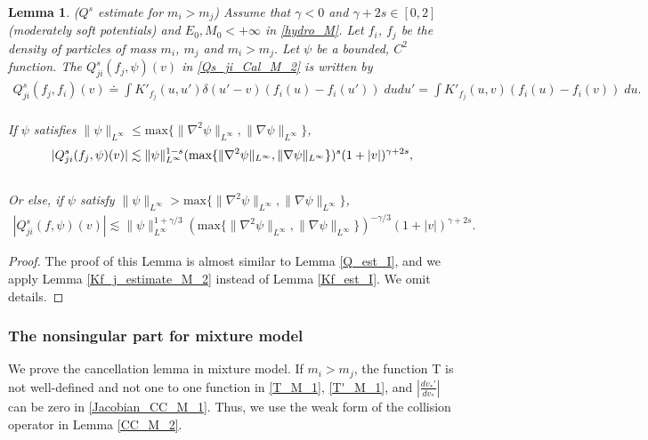 \documentclass[reqno,10pt]{amsart}
\newtheorem{lemma}[theorem]{Lemma}
\numberwithin{equation}{section}
\begin{document}
\begin{lemma} ($Q^s$ estimate for $m_i > m_j$) \label{Q_est_M_2} Assume that $\gamma<0$ and $\gamma+2s \in [0,2]$(moderately soft potentials) and $E_0,M_0<+\infty$ in \eqref{hydro_M}. Let $f_i$, $f_j$ be the density of particles of mass $m_i$, $m_j$ and $m_i>m_j.$ Let $\psi$ be a bounded, $C^2$ function. The $Q^{s}_{ji}(f_j,\psi)(v)$ in \eqref{Qs_ji_Cal_M_2} is written by
\begin{align*}
 Q_{ji}^{s}(f_j,f_i)(v) \doteq \int K'_{f_j}(u,u')\delta(u'-v)(f_i(u)-f_i(u')) \;dudu'= \int K'_{f_j}(u,v)(f_i(u)-f_i(v))\;du.
\end{align*} \\
\noindent If $\psi$ satisfies $\|\psi\|_{L^{\infty}} \leq \text{max} \{\|\nabla^2 \psi\|_{L^\infty}, \|\nabla\psi\|_{L^\infty} \}$, 
\begin{align} \label{Q_est_1_M_2}
     |Q_{ji}^{s}(f_j,\psi)(v)| 
    \lesssim
  \|\psi\|_{L^{\infty}}^{1-s}(\text{max}\{\|\nabla^2 \psi\|_{L^\infty}, \|\nabla \psi\|_{L^\infty} \})^{s}(1+|v|)^{\gamma+2s},\\ \notag  
\end{align} 
Or else, if $\psi$ satisfy $\|\psi\|_{L^{\infty}} > \text{max} \{\|\nabla^2 \psi\|_{L^\infty}, \|\nabla\psi\|_{L^\infty} \}$, 
\begin{align*}
     |Q^{s}_{ji}(f,\psi)(v)| 
    \lesssim
    \|\psi\|_{L^{\infty}}^{1+\gamma/3}(\text{max}\{\|\nabla^2 \psi\|_{L^\infty}, \|\nabla \psi\|_{L^\infty} \})^{-\gamma/3}(1+|v|)^{\gamma+2s}.
\end{align*}
\end{lemma}
\begin{proof} 
The proof of this Lemma is almost similar to Lemma \ref{Q_est_I}, and we apply Lemma \ref{Kf_j_estimate_M_2} instead of Lemma \ref{Kf_est_I}. We omit details.
\end{proof} \vspace{3mm}

\subsubsection{The nonsingular part for mixture model}
We prove the cancellation lemma in mixture model.
If $m_i>m_j$, the function T is not well-defined and not one to one function in \eqref{T_M_1}, \eqref{T'_M_1}, and $|\frac{dv_*'}{dv_*}|$ can be zero in \eqref{Jacobian_CC_M_1}. Thus, we use the weak form of the collision operator in Lemma \ref{CC_M_2}.
\vspace{2mm}
\end{document}
